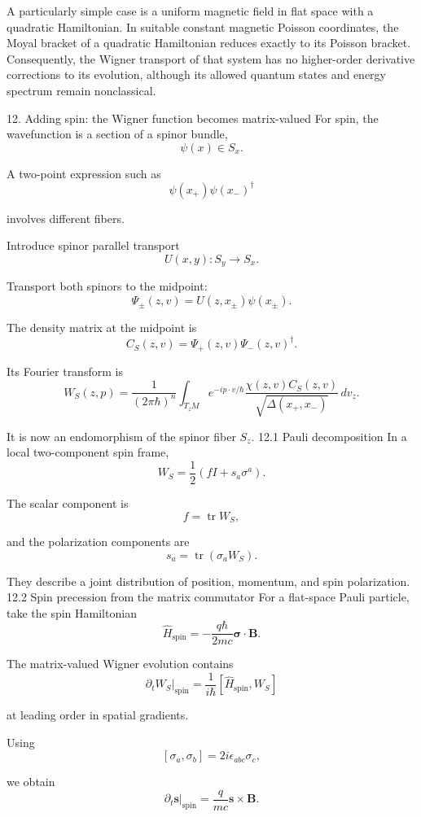 A particularly simple case is a uniform magnetic field in flat space with a quadratic Hamiltonian. In suitable constant magnetic Poisson coordinates, the Moyal bracket of a quadratic Hamiltonian reduces exactly to its Poisson bracket. Consequently, the Wigner transport of that system has no higher-order derivative corrections to its evolution, although its allowed quantum states and energy spectrum remain nonclassical.

12. Adding spin: the Wigner function becomes matrix-valued
For spin, the wavefunction is a section of a spinor bundle,
\[
\psi(x)\in S_x.
\]

A two-point expression such as
\[
\psi(x_+)\psi(x_-)^\dagger
\]

involves different fibers.

Introduce spinor parallel transport
\[
U(x,y):S_y\rightarrow S_x.
\]

Transport both spinors to the midpoint:
\[
\Psi_\pm(z,v)=U(z,x_\pm)\psi(x_\pm).
\tag{88}
\]

The density matrix at the midpoint is
\[
C_S(z,v)=\Psi_+(z,v)\Psi_-(z,v)^\dagger.
\tag{89}
\]

Its Fourier transform is
\[
\boxed{
W_S(z,p)=
\frac1{(2\pi\hbar)^n}
\int_{T_zM}
e^{-ip\cdot v/\hbar}
\frac{\chi(z,v)C_S(z,v)}
{\sqrt{\Delta(x_+,x_-)}}\,dv_z.
}
\tag{90}
\]

It is now an endomorphism of the spinor fiber \(S_z\).
12.1 Pauli decomposition
In a local two-component spin frame,
\[
W_S=\frac12(fI+s_a\sigma^a).
\tag{91}
\]

The scalar component is
\[
f=\operatorname{tr}W_S,
\]

and the polarization components are
\[
s_a=\operatorname{tr}(\sigma_aW_S).
\tag{92}
\]

They describe a joint distribution of position, momentum, and spin polarization.
12.2 Spin precession from the matrix commutator
For a flat-space Pauli particle, take the spin Hamiltonian
\[
\widehat H_{\mathrm{spin}}
=
-\frac{q\hbar}{2mc}\boldsymbol{\sigma}\cdot\mathbf B.
\tag{93}
\]

The matrix-valued Wigner evolution contains
\[
\left.\partial_tW_S\right|_{\mathrm{spin}}
=
\frac1{i\hbar}
[\widehat H_{\mathrm{spin}},W_S]
\]

at leading order in spatial gradients.

Using
\[
[\sigma_a,\sigma_b]
=
2i\epsilon_{abc}\sigma_c,
\]

we obtain
\[
\boxed{
\left.\partial_t\mathbf s\right|_{\mathrm{spin}}
=
\frac q{mc}\mathbf s\times\mathbf B.
}
\tag{94}
\]

